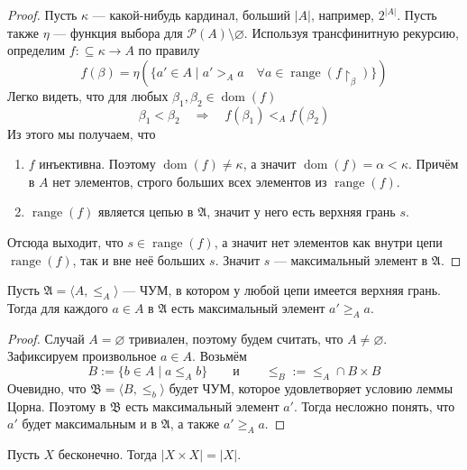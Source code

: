 \documentclass[12pt,a4paper]{article}
\newcommand{\subsets}{\ensuremath{\mathcal{P}}\xspace}
\DeclareMathOperator{\dom}{dom}
\DeclareMathOperator{\range}{range}
\newcommand{\ZFC}{\ensuremath{\mathrm{ZFC}}\xspace}
\begin{document}
    \begin{proof}
        Пусть $\kappa$ --- какой-нибудь кардинал, больший $|A|$, например, $2^{|A|}$. Пусть также $\eta$ --- функция выбора для $\subsets(A) \setminus \varnothing$. Используя трансфинитную рекурсию, определим $f: \subseteq \kappa \to A$ по правилу
        \[f(\beta) = \eta(\{a' \in A \mid a' >_A a \quad \forall a \in \range(f \upharpoonright_\beta)\})\]
        Легко видеть, что для любых $\beta_1, \beta_2 \in \dom(f)$
        \[\beta_1 < \beta_2 \quad \Longrightarrow \quad f(\beta_1) <_A f(\beta_2)\]
        Из этого мы получаем, что
        \begin{enumerate}
            \item $f$ инъективна. Поэтому $\dom(f) \neq \kappa$, а значит $\dom(f) = \alpha < \kappa$. Причём в $A$ нет элементов, строго больших всех элементов из $\range(f)$.
            \item $\range(f)$ является цепью в $\mathfrak{A}$, значит у него есть верхняя грань $s$.
        \end{enumerate}
        Отсюда выходит, что $s \in \range(f)$, а значит нет элементов как внутри цепи $\range(f)$, так и вне неё больших $s$. Значит $s$ --- максимальный элемент в $\mathfrak{A}$.
    \end{proof}

    \begin{corollary}[в \ZFC]
        Пусть $\mathfrak{A} = \langle A, \leqslant_A \rangle$ --- ЧУМ, в котором у любой цепи имеется верхняя грань. Тогда для каждого $a \in A$ в $\mathfrak{A}$ есть максимальный элемент $a' \geqslant_A a$.
    \end{corollary}

    \begin{proof}
        Случай $A = \varnothing$ тривиален, поэтому будем считать, что $A \neq \varnothing$. Зафиксируем произвольное $a \in A$. Возьмём
        \[B := \{b \in A \mid a \leqslant_A b\} \qquad \text{и} \qquad {\leqslant}_B := {\leqslant}_A \cap B \times B\]
        Очевидно, что $\mathfrak{B} = \langle B, \leqslant_b \rangle$ будет ЧУМ, которое удовлетворяет условию леммы Цорна. Поэтому в $\mathfrak{B}$ есть максимальный элемент $a'$. Тогда несложно понять, что $a'$ будет максимальным и в $\mathfrak{A}$, а также $a' \geqslant_A a$.
    \end{proof}

    \begin{theorem}[в \ZFC]
        Пусть $X$ бесконечно. Тогда $|X \times X| = |X|$.
    \end{theorem}
\end{document}
